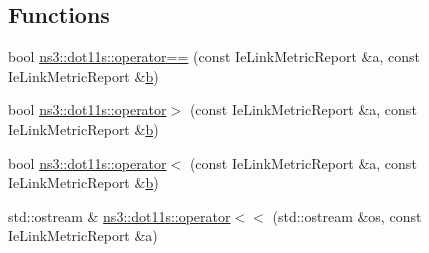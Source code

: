 \subsection*{Functions}
\begin{DoxyCompactItemize}
\item 
bool \hyperlink{namespacens3_1_1dot11s_a791fd928325c7f4c38a4130951fc3abf}{ns3\+::dot11s\+::operator==} (const Ie\+Link\+Metric\+Report \&a, const Ie\+Link\+Metric\+Report \&\hyperlink{lte__pathloss_8m_a21ad0bd836b90d08f4cf640b4c298e7c}{b})
\item 
bool \hyperlink{namespacens3_1_1dot11s_a3b004e1f897b553adb22c45f5e3ea45a}{ns3\+::dot11s\+::operator$>$} (const Ie\+Link\+Metric\+Report \&a, const Ie\+Link\+Metric\+Report \&\hyperlink{lte__pathloss_8m_a21ad0bd836b90d08f4cf640b4c298e7c}{b})
\item 
bool \hyperlink{namespacens3_1_1dot11s_a712de4d131042d7602f9bac0f5bd8460}{ns3\+::dot11s\+::operator$<$} (const Ie\+Link\+Metric\+Report \&a, const Ie\+Link\+Metric\+Report \&\hyperlink{lte__pathloss_8m_a21ad0bd836b90d08f4cf640b4c298e7c}{b})
\item 
std\+::ostream \& \hyperlink{namespacens3_1_1dot11s_a89ead06e9318289d69ed6fbfb1de8924}{ns3\+::dot11s\+::operator$<$$<$} (std\+::ostream \&os, const Ie\+Link\+Metric\+Report \&a)
\end{DoxyCompactItemize}
